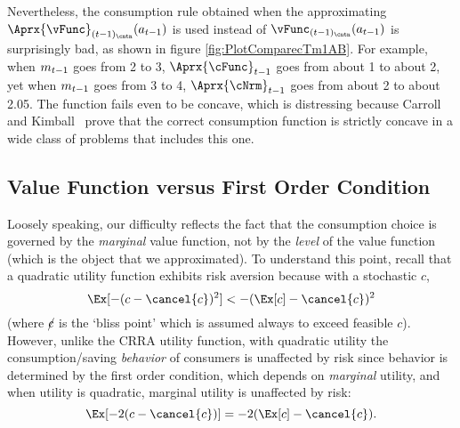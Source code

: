 Nevertheless, the consumption rule obtained when the approximating $\Aprx{\vFunc}_{({\prdT-1})_\cntn}({a}_{\prdT-1})$ is used instead of $\vFunc_{({\prdT-1})_\cntn}({a}_{\prdT-1})$ is surprisingly bad, as shown in figure \ref{fig:PlotComparecTm1AB}.  For example, when ${m}_{t-1}$ goes from 2 to 3, $\Aprx{\cFunc}_{\prdT-1}$ goes from about 1 to about 2, yet when ${m}_{t-1}$ goes from 3 to 4, $\Aprx{\cNrm}_{\prdT-1}$ goes from about 2 to about 2.05.  The function fails even to be concave, which is distressing because Carroll and Kimball~\citeyearpar{ckConcavity} prove that the correct consumption function is strictly concave in a wide class of problems that includes this one.

\hypertarget{value-function-versus-first-order-condition}{}
\subsection{Value Function versus First Order Condition}\label{subsec:vVsuP}

Loosely speaking, our difficulty reflects the fact that the
consumption choice is governed by the \textit{marginal} value function,
not by the \textit{level} of the value function (which is the object that
we approximated).  To understand this point, recall that a quadratic
utility function
 exhibits
risk aversion because with a stochastic ${c}$,
\begin{equation}
  \Ex[-({c} - \cancel{c})^{2}] < - (\Ex[{c}] - \cancel{c})^{2}
\end{equation}
(where $\cancel{c}$ is the `bliss point' which is assumed always to exceed feasible ${c}$). However, unlike the CRRA utility function,
with quadratic utility the consumption/saving \textit{behavior} of consumers
is unaffected by risk since behavior is determined by the first order condition, which
depends on \textit{marginal} utility, and when utility is quadratic, marginal utility is unaffected
by risk:
\begin{equation}
  \Ex[-2({c} - \cancel{c})] = - 2(\Ex[{c}] - \cancel{c}).
\end{equation}

